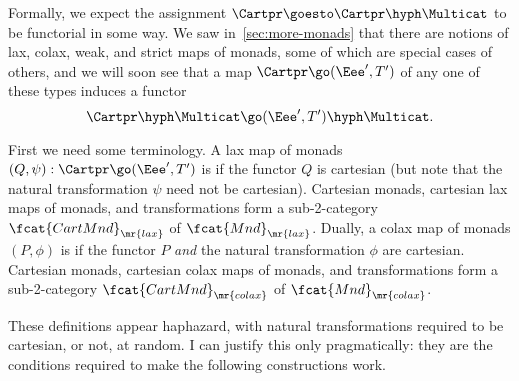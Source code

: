 Formally, we expect the assignment $\Cartpr \goesto \Cartpr\hyph\Multicat$
to be functorial in some way.  We saw in~\ref{sec:more-monads} that there
are notions of lax, colax, weak, and strict maps of monads, some of which
are special cases of others, and we will soon see that a map $\Cartpr \go 
(\Eee', T')$ of any one of these types induces a functor
\[
\Cartpr\hyph\Multicat \go (\Eee',T')\hyph\Multicat.
\]

First we need some terminology.  A lax map of monads $(Q, \psi): \Cartpr
\go (\Eee',T')$ is %
%
%
%
%
%
if the functor $Q$ is cartesian (but
note that the natural transformation $\psi$ need not be cartesian).
Cartesian monads, cartesian lax maps of monads, and transformations form a
sub-2-category $\fcat{CartMnd}_\mr{lax}$%
% 
% 
of $\fcat{Mnd}_\mr{lax}$.  Dually, a colax map of monads $(P, \phi)$ is
 if the functor $P$ \emph{and} the natural transformation
$\phi$ are cartesian.  Cartesian monads, cartesian colax maps of monads,
and transformations form a sub-2-category $\fcat{CartMnd}_\mr{colax}$ of
$\fcat{Mnd}_\mr{colax}$.

These definitions appear haphazard, with natural transformations required
to be cartesian, or not, at random.  I can justify this only pragmatically:
they are the conditions required to make the following constructions work.

